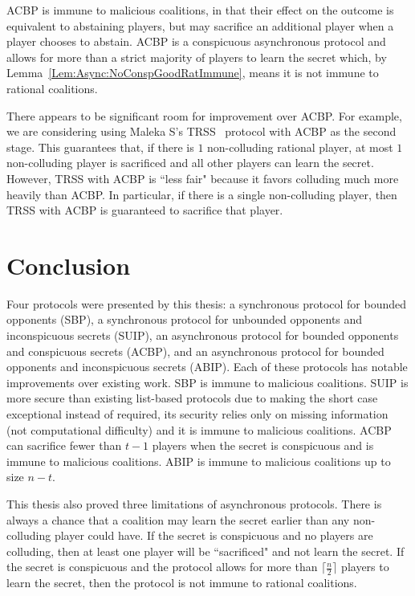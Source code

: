 \documentclass[12pt]{article}
\begin{document}
ACBP is immune to malicious coalitions, in that their effect on the outcome is equivalent to abstaining players, but may sacrifice an additional player when a player chooses to abstain. ACBP is a conspicuous asynchronous protocol and allows for more than a strict majority of players to learn the secret which, by Lemma~\ref{Lem:Async:NoConspGoodRatImmune}, means it is not immune to rational coalitions.

There appears to be significant room for improvement over ACBP. For example, we are considering using Maleka S's TRSS~\cite{MalekaS_08} protocol with ACBP as the second stage. This guarantees that, if there is $1$ non-colluding rational player, at most $1$ non-colluding player is sacrificed and all other players can learn the secret. However, TRSS with ACBP is ``less fair" because it favors colluding much more heavily than ACBP. In particular, if there is a single non-colluding player, then TRSS with ACBP is guaranteed to sacrifice that player.






\section{Conclusion}
\label{section:Conclusion}

Four protocols were presented by this thesis: a synchronous protocol for bounded opponents (SBP), a synchronous protocol for unbounded opponents and inconspicuous secrets (SUIP), an asynchronous protocol for bounded opponents and conspicuous secrets (ACBP), and an asynchronous protocol for bounded opponents and inconspicuous secrets (ABIP). Each of these protocols has notable improvements over existing work. SBP is immune to malicious coalitions. SUIP is more secure than existing list-based protocols due to making the short case exceptional instead of required, its security relies only on missing information (not computational difficulty) and it is immune to malicious coalitions. ACBP can sacrifice fewer than $t-1$ players when the secret is conspicuous and is immune to malicious coalitions. ABIP is immune to malicious coalitions up to size $n-t$.

This thesis also proved three limitations of asynchronous protocols. There is always a chance that a coalition may learn the secret earlier than any non-colluding player could have. If the secret is conspicuous and no players are colluding, then at least one player will be ``sacrificed" and not learn the secret. If the secret is conspicuous and the protocol allows for more than $\lceil \frac{n}{2} \rceil$ players to learn the secret, then the protocol is not immune to rational coalitions.
\end{document}
